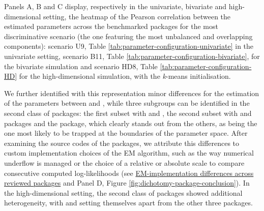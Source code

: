 Panels A, B and C display, respectively in the univariate, bivariate and high-dimensional setting, the heatmap of the Pearson correlation between the estimated parameters across the benchmarked packages for the most discriminative scenario (the one featuring the most unbalanced and overlapping components): scenario U9, Table \ref{tab:parameter-configuration-univariate} in the univariate setting, scenario B11, Table \ref{tab:parameter-configuration-bivariate}, for the bivariate simulation and scenario HD8, Table \ref{tab:parameter-configuration-HD} for the high-dimensional simulation, with the \emph{k}-means initialisation.

We further identified with this representation minor differences for the estimation of the parameters between  and , while three subgroups can be identified in the second class of packages: the first subset with  and , the second subset with  and  packages and the  package, which clearly stands out from the others, as being the one most likely to be trapped at the boundaries of the parameter space. After examining the source codes of the packages, we attribute this differences to custom implementation choices of the EM algorithm, such as the way numerical underflow is managed or the choice of a relative or absolute scale to compare consecutive computed log-likelihoods (see \protect\hyperlink{em-implementation-differences-across-reviewed-packages}{EM-implementation differences across reviewed packages} and Panel D, Figure \ref{fig:dichotomy-package-conclusion}). \color{blue} In the high-dimensional setting, the second class of packages showed additional heterogeneity, with  and  setting themselves apart from the other three packages.\color{black}

